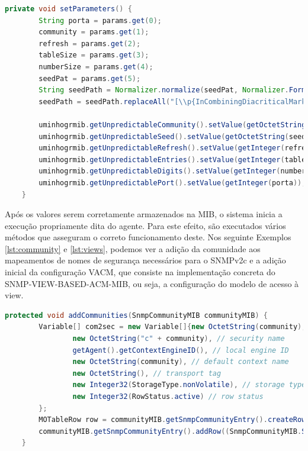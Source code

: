 \documentclass[../momento_1.tex]{subfiles}
\begin{document}
{
\begin{lstlisting}[caption={Método utilizado para guardar os parâmetros do ficheiro de configuração na MIB.},label={lst:guardar},language=JAVA]
	private void setParameters() {
        String porta = params.get(0);
        community = params.get(1);
        refresh = params.get(2);
        tableSize = params.get(3);
        numberSize = params.get(4);
        seedPat = params.get(5);
        String seedPath = Normalizer.normalize(seedPat, Normalizer.Form.NFD);
        seedPath = seedPath.replaceAll("[\\p{InCombiningDiacriticalMarks}]", "");

        uminhogrmib.getUnpredictableCommunity().setValue(getOctetString(community));
        uminhogrmib.getUnpredictableSeed().setValue(getOctetString(seedPath));
        uminhogrmib.getUnpredictableRefresh().setValue(getInteger(refresh));
        uminhogrmib.getUnpredictableEntries().setValue(getInteger(tableSize));
        uminhogrmib.getUnpredictableDigits().setValue(getInteger(numberSize));
        uminhogrmib.getUnpredictablePort().setValue(getInteger(porta));
    }
\end{lstlisting}}

Após os valores serem corretamente armazenados na MIB, o sistema inicia a execução propriamente dita do agente. Para este efeito, são executados vários métodos que asseguram o correto funcionamento deste. Nos seguinte Exemplos \ref{lst:community} e \ref{lst:views}, podemos ver a adição da comunidade aos mapeamentos de nomes de segurança necessários para o SNMPv2c e a adição inicial da configuração VACM, que consiste na implementação concreta do SNMP-VIEW-BASED-ACM-MIB, ou seja, a configuração do modelo de acesso à view.\\

{
\begin{lstlisting}[caption={Método utilizado para da comunidade.},label={lst:community},language=JAVA]
	protected void addCommunities(SnmpCommunityMIB communityMIB) {
        Variable[] com2sec = new Variable[]{new OctetString(community),
                new OctetString("c" + community), // security name
                getAgent().getContextEngineID(), // local engine ID
                new OctetString(community), // default context name
                new OctetString(), // transport tag
                new Integer32(StorageType.nonVolatile), // storage type
                new Integer32(RowStatus.active) // row status
        };
        MOTableRow row = communityMIB.getSnmpCommunityEntry().createRow(new OctetString("public2public").toSubIndex(true), com2sec);
        communityMIB.getSnmpCommunityEntry().addRow((SnmpCommunityMIB.SnmpCommunityEntryRow) row);
    }
\end{lstlisting}}
\end{document}

